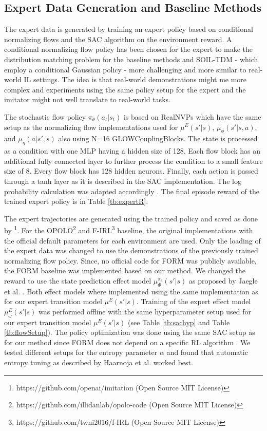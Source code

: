 \documentclass{article}
\begin{document}
\subsection{Expert Data Generation and Baseline Methods}\label{appendix:expSetup}
The expert data is generated by training an expert policy based on conditional normalizing flows and the SAC algorithm on the environment reward. A conditional normalizing flow policy has been chosen for the expert to make the distribution matching problem for the baseline methods and SOIL-TDM - which employ a conditional Gaussian policy - more challenging and more similar to real-world IL settings. The idea is that real-world demonstrations might me more complex and experiments using the same policy setup for the expert and the imitator might not well translate to real-world tasks. 

The stochastic flow policy $\pi_{\theta}(a_t|s_t)$ is based on RealNVPs \cite{realNVP} which have the same setup as the normalizing flow implementations used for $\mu^E(s'|s)$, $\mu_{\phi}(s'|s, a)$, and $\mu_{\eta}(a|s', s)$ also using N=16 GLOWCouplingBlocks. The state is processed as a condition with one MLP having a hidden size of 128. Each flow block has an additional fully connected layer to further process the condition to a small feature size of 8. Every flow block has 128 hidden neurons. Finally, each action is passed through a tanh layer as it is described in the SAC implementation. The log probability calculation was adapted accordingly \cite{haarnoja2018sacapps}. The final episode reward of the trained expert policy is in Table \ref{tb:expertR}. 

The expert trajectories are generated using the trained policy and saved as done by \cite{GAIL}\footnote{ https://github.com/openai/imitation (Open Source MIT License)}. For the OPOLO\footnote{https://github.com/illidanlab/opolo-code (Open Source MIT License)} and F-IRL\footnote{https://github.com/twni2016/f-IRL (Open Source MIT License)} baseline, the original implementations with the official default parameters for each environment are used. Only the loading of the expert data was changed to use the demonstrations of the previously trained normalizing flow policy. Since, no official code for FORM was publicly available, the FORM baseline was implemented based on our method. We changed the reward to use the state prediction effect model $\mu^{\pi_{\theta}}_{\Phi}(s'|s)$ as proposed by Jaegle et al. . Both effect models where implemented using the same implementation as for our expert transition model $\mu^E(s'|s)$. Training of the expert effect model $\mu^{E}_{\omega}(s'|s)$ was performed offline with the same hyperparameter setup used for our expert transition model $\mu^E(s'|s)$ (see Table \ref{tb:sachyp} and Table \ref{tb:flowSetup}). The policy optimization was done using the same SAC setup as for our method since FORM does not depend on a specific RL algorithm \cite{jaegle2021imitation}. We tested different setups for the entropy parameter $\alpha$ and found that automatic entropy tuning as described by Haarnoja et al.  worked best. 
\end{document}
